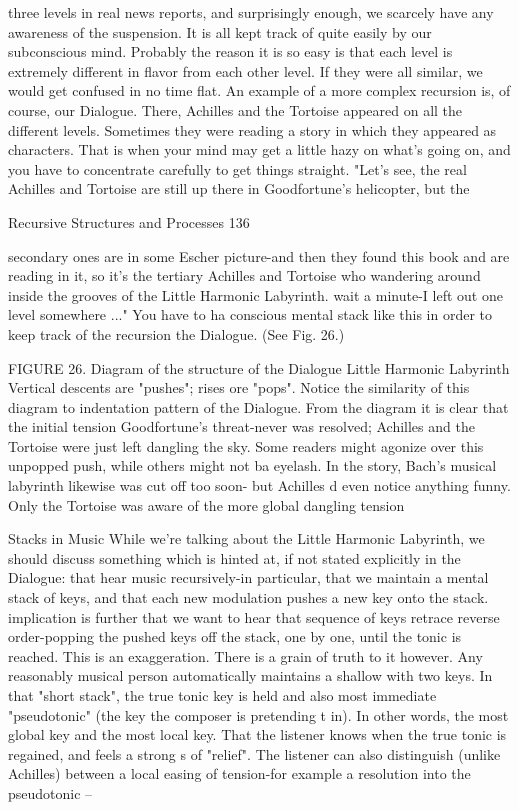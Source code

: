 three levels in real news reports, and surprisingly enough, we scarcely have any
awareness of the suspension. It is all kept track of quite easily by our subconscious mind.
Probably the reason it is so easy is that each level is extremely different in flavor from
each other level. If they were all similar, we would get confused in no time flat.
         An example of a more complex recursion is, of course, our Dialogue. There,
Achilles and the Tortoise appeared on all the different levels. Sometimes they were
reading a story in which they appeared as characters. That is when your mind may get a
little hazy on what's going on, and you have to concentrate carefully to get things straight.
"Let's see, the real Achilles and Tortoise are still up there in Goodfortune's helicopter, but
the




Recursive Structures and Processes                                                        136

secondary ones are in some Escher picture-and then they found this book and are reading
in it, so it's the tertiary Achilles and Tortoise who wandering around inside the grooves
of the Little Harmonic Labyrinth. wait a minute-I left out one level somewhere ..." You
have to ha conscious mental stack like this in order to keep track of the recursion the
Dialogue. (See Fig. 26.)




FIGURE 26. Diagram of the structure of the Dialogue Little Harmonic Labyrinth
Vertical descents are "pushes"; rises ore "pops". Notice the similarity of this diagram to
indentation pattern of the Dialogue. From the diagram it is clear that the initial tension
Goodfortune's threat-never was resolved; Achilles and the Tortoise were just left
dangling the sky. Some readers might agonize over this unpopped push, while others
might not ba eyelash. In the story, Bach's musical labyrinth likewise was cut off too soon-
but Achilles d even notice anything funny. Only the Tortoise was aware of the more
global dangling tension

                                   Stacks in Music
        While we're talking about the Little Harmonic Labyrinth, we should discuss
something which is hinted at, if not stated explicitly in the Dialogue: that hear music
recursively-in particular, that we maintain a mental stack of keys, and that each new
modulation pushes a new key onto the stack. implication is further that we want to hear
that sequence of keys retrace reverse order-popping the pushed keys off the stack, one by
one, until the tonic is reached. This is an exaggeration. There is a grain of truth to it
however.
        Any reasonably musical person automatically maintains a shallow with two keys.
In that "short stack", the true tonic key is held and also most immediate "pseudotonic"
(the key the composer is pretending t in). In other words, the most global key and the
most local key. That the listener knows when the true tonic is regained, and feels a strong
s of "relief". The listener can also distinguish (unlike Achilles) between a local easing of
tension-for example a resolution into the pseudotonic --




